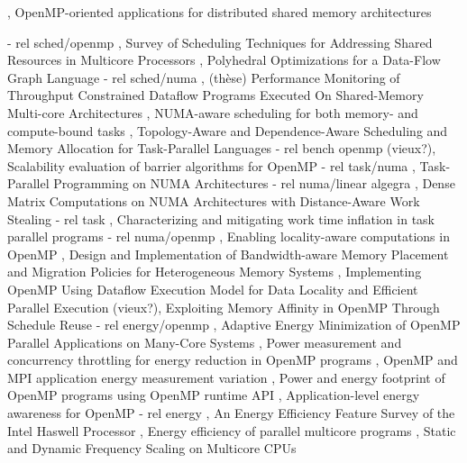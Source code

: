 


\cite{Marowka2004}, OpenMP-oriented applications for distributed shared memory architectures

  - rel sched/openmp
\cite{Zhuravlev2012}, Survey of Scheduling Techniques for Addressing Shared Resources in Multicore Processors
\cite{Sbirlea2015}, Polyhedral Optimizations for a Data-Flow Graph Language
  - rel sched/numa
\cite{Selva2015}, (thèse) Performance Monitoring of Throughput Constrained Dataflow Programs Executed On Shared-Memory Multi-core Architectures
\cite{Reinman2015}, NUMA-aware scheduling for both memory- and compute-bound tasks
\cite{Drebes2014}, Topology-Aware and Dependence-Aware Scheduling and Memory Allocation for Task-Parallel Languages
  - rel bench openmp
(vieux?)\cite{Nanjegowda2009}, Scalability evaluation of barrier algorithms for OpenMP
  - rel task/numa
\cite{Wienke2012}, Task-Parallel Programming on NUMA Architectures
  - rel numa/linear algegra
\cite{Al-Omairy2015}, Dense Matrix Computations on NUMA Architectures with Distance-Aware Work Stealing
  - rel task
\cite{Olivier2013}, Characterizing and mitigating work time inflation in task parallel programs
  - rel numa/openmp
\cite{Huang2010}, Enabling locality-aware computations in OpenMP
\cite{Yu2017}, Design and Implementation of Bandwidth-aware Memory Placement and Migration Policies for Heterogeneous Memory Systems
\cite{Weng2002}, Implementing OpenMP Using Dataflow Execution Model for Data Locality and Efficient Parallel Execution
(vieux?)\cite{Nikolopoulos2001}, Exploiting Memory Affinity in OpenMP Through Schedule Reuse
  - rel energy/openmp
\cite{Shafik2015}, Adaptive Energy Minimization of OpenMP Parallel Applications on Many-Core Systems
\cite{Porterfield2013}, Power measurement and concurrency throttling for energy reduction in OpenMP programs
\cite{Porterfield2013a}, OpenMP and MPI application energy measurement variation
\cite{Nandamuri2015}, Power and energy footprint of OpenMP programs using OpenMP runtime API
\cite{Alessi2015}, Application-level energy awareness for OpenMP
  - rel energy
\cite{Hackenberg2015}, An Energy Efficiency Feature Survey of the Intel Haswell Processor
\cite{Davidovic2015}, Energy efficiency of parallel multicore programs
\cite{Bao2016}, Static and Dynamic Frequency Scaling on Multicore CPUs

